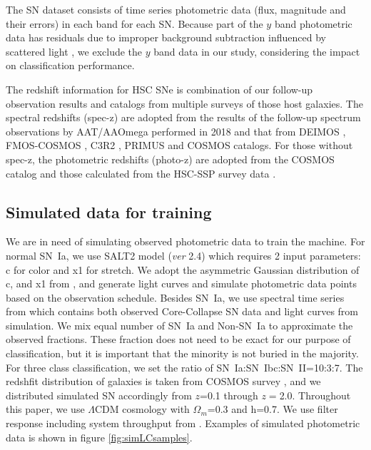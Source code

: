 \documentclass[useamsfonts]{pasj01}
\begin{document}
The SN dataset consists of time series photometric data (flux, magnitude and their errors) in each band for each SN.
Because part of the $y$ band photometric data has residuals due to improper background subtraction influenced by scattered light \citep{aihara18dr},
we exclude the $y$ band data in our study, considering the impact on classification performance.

The redshift information for HSC SNe is combination of our follow-up observation results and catalogs from multiple surveys of those host galaxies.
The spectral redshifts (spec-z) are adopted from the results of the follow-up spectrum observations by AAT/AAOmega performed in 2018 and that from DEIMOS \citep{DEIMOS2018}, FMOS-COSMOS \citep{FMOS-COSMOS2015}, C3R2 \citep{C3R2_2017}, PRIMUS \citep{PRIMUS2011} and COSMOS catalogs.
For those without spec-z, the photometric redshifts (photo-z) are adopted from the COSMOS catalog and those calculated from the HSC-SSP survey data \citep{HSCSSP_photo-z2018}.



\subsection{Simulated data for training}
\label{sec:training}
We are in need of simulating observed photometric data to train the machine.  
For normal SN~Ia, we use SALT2 \citep{guy10b} model ({\it ver} 2.4) which requires 2 input parameters: c for color and x1 for stretch.
We adopt the asymmetric Gaussian distribution of c, and x1 from \citet{mosher14a}, and generate
light curves and simulate photometric data points based on the observation schedule. 
Besides SN~Ia, we use spectral time series from \citet{kessler19b} which contains both observed Core-Collapse SN data and light curves from simulation.
We mix equal number of SN~Ia and Non-SN~Ia to approximate the observed fractions. 
These fraction does not need to be exact for our purpose of classification, but it is important
that the minority is not buried in the majority.
For three class classification, we set the ratio of SN~Ia:SN~Ibc:SN~II=10:3:7.
The redshfit distribution of galaxies is taken from COSMOS survey \citep{laigle16a}, and we distributed simulated SN accordingly from $z$=0.1 through $z=$2.0.
Throughout this paper, we use $\Lambda$CDM cosmology with $\Omega_{m}$=0.3 and h=0.7.
We use filter response including system throughput from \citet{kawanomoto18a}. 
Examples of simulated photometric data is shown in figure \ref{fig:simLCsamples}.
\end{document}
